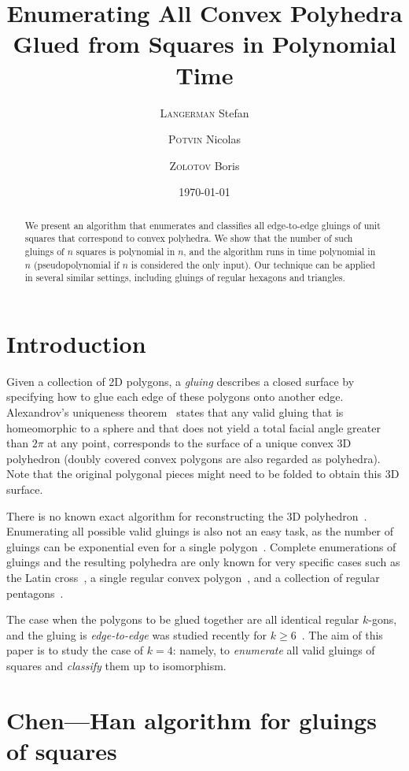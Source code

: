 \documentclass[a4paper,11pt]{article}
\title{Enumerating All Convex Polyhedra Glued from Squares in Polynomial Time}
\author{{\scshape Langerman} Stefan\and {\scshape Potvin} Nicolas \and {\scshape Zolotov} Boris}
\date{\today}
\begin{document}
 \maketitle

\begin{abstract}We present an algorithm that enumerates and classifies all edge-to-edge gluings of unit squares that correspond to convex polyhedra. We show that the number of such gluings of $n$ squares is polynomial in $n$, and the algorithm runs in time polynomial in $n$ (pseudopolynomial if $n$ is considered the only input). Our technique can be applied in several similar settings, including gluings of regular hexagons and triangles.\end{abstract}

\section{Introduction}

Given a collection of 2D polygons, a \emph{gluing} describes a closed surface by specifying how to glue each edge of these polygons onto another edge. Alexandrov's uniqueness theorem~\cite{alex} states that any valid gluing that is homeomorphic to a sphere and that does not yield a total facial angle greater than $2\pi$ at any point, corresponds to the surface of a unique convex 3D polyhedron (doubly covered convex polygons are also regarded as polyhedra). Note that the original polygonal pieces might need to be folded to obtain this 3D surface.

There is no known exact algorithm for reconstructing the 3D polyhedron~\cite{bannister2014galois,kpd09-approx}. Enumerating all possible valid gluings is also not an easy task, as the number of gluings can be exponential even for a single polygon~\cite{DDLO02}. Complete enumerations of gluings and the resulting polyhedra are only known for very specific cases such as the Latin cross~\cite{ddlop99}, a single regular convex polygon~\cite{DO07}, and a collection of regular pentagons~\cite{alz-penta}.

The case when the polygons to be glued together are all identical regular $k$-gons, and the gluing is \emph{edge-to-edge} was studied recently for $k \ge 6$~\cite{kl17-hex}. The aim of this paper is to study the case of $k=4$: namely, to {\it enumerate} all valid gluings of squares and {\it classify} them up to isomorphism.

\section{Chen—Han algorithm for gluings of squares}
\end{document}
